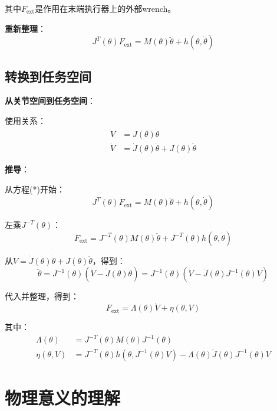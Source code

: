 \documentclass[12pt,a4paper]{article}
\begin{document}
其中$F_{\text{ext}}$是作用在末端执行器上的外部wrench。

\textbf{重新整理}：
\begin{equation}
J^T(\theta)F_{\text{ext}} = M(\theta)\ddot{\theta} + h(\theta, \dot{\theta}) \tag{*}
\end{equation}

\subsection{转换到任务空间}

\textbf{从关节空间到任务空间}：

使用关系：
\begin{align}
V &= J(\theta)\dot{\theta} \tag{8.83} \\
\dot{V} &= \dot{J}(\theta)\dot{\theta} + J(\theta)\ddot{\theta} \tag{8.84}
\end{align}

\textbf{推导}：

从方程(*)开始：
\begin{equation}
J^T(\theta)F_{\text{ext}} = M(\theta)\ddot{\theta} + h(\theta, \dot{\theta})
\end{equation}

左乘$J^{-T}(\theta)$：
\begin{equation}
F_{\text{ext}} = J^{-T}(\theta)M(\theta)\ddot{\theta} + J^{-T}(\theta)h(\theta, \dot{\theta})
\end{equation}

从$\dot{V} = \dot{J}(\theta)\dot{\theta} + J(\theta)\ddot{\theta}$，得到：
\begin{equation}
\ddot{\theta} = J^{-1}(\theta)(\dot{V} - \dot{J}(\theta)\dot{\theta}) = J^{-1}(\theta)(\dot{V} - \dot{J}(\theta)J^{-1}(\theta)V)
\end{equation}

代入并整理，得到：
\begin{equation}
F_{\text{ext}} = \Lambda(\theta)\dot{V} + \eta(\theta, V) \tag{8.89}
\end{equation}

其中：
\begin{align}
\Lambda(\theta) &= J^{-T}(\theta)M(\theta)J^{-1}(\theta) \tag{8.90} \\
\eta(\theta, V) &= J^{-T}(\theta)h(\theta, J^{-1}(\theta)V) - \Lambda(\theta)\dot{J}(\theta)J^{-1}(\theta)V \tag{8.91}
\end{align}

\section{物理意义的理解}
\end{document}
